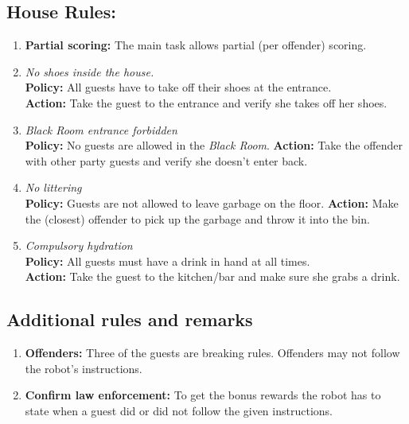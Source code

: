 \subsection*{House Rules:}
\begin{enumerate}[nosep]
	\item \textbf{Partial scoring:} The main task allows partial (per offender) scoring.
	\item \textit{No shoes inside the house.}\\
	\textbf{Policy:} All guests have to take off their shoes at the entrance.\\
	\textbf{Action:} Take the guest to the entrance and verify she takes off her shoes.

	\item \textit{Black Room entrance forbidden}\\
	\textbf{Policy:} No guests are allowed in the \emph{Black Room}.
	\textbf{Action:} Take the offender with other party guests and verify she doesn't enter back.

	\item \textit{No littering}\\
	\textbf{Policy:} Guests are not allowed to leave garbage on the floor.
	\textbf{Action:} Make the (closest) offender to pick up the garbage and throw it into the bin.

	\item \textit{Compulsory hydration}\\
	\textbf{Policy:} All guests must have a drink in hand at all times.\\
	\textbf{Action:} Take the guest to the kitchen/bar and make sure she grabs a drink.
\end{enumerate}

\subsection*{Additional rules and remarks}
\begin{enumerate}[nosep]
	\item \textbf{Offenders:} Three of the guests are breaking rules.
	Offenders may not follow the robot's instructions.

	\item \textbf{Confirm law enforcement:} To get the bonus rewards the robot has to state when a guest did or did not follow the given instructions.

\end{enumerate}


